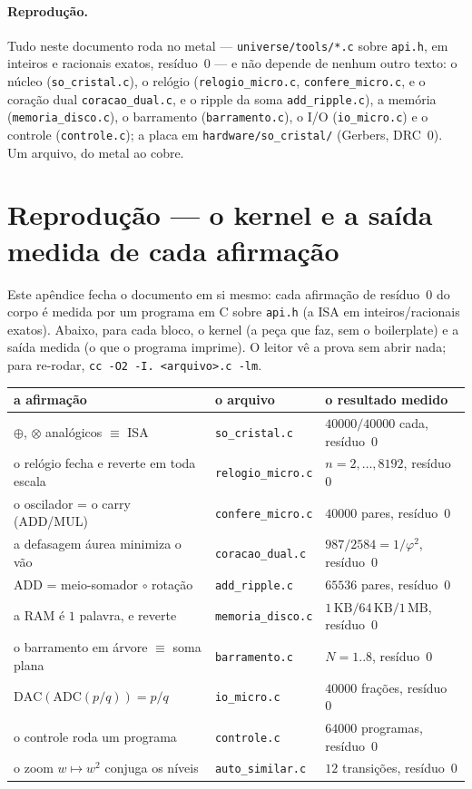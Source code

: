 \documentclass[11pt,a4paper]{article}
\begin{document}
\paragraph{Reprodução.}
Tudo neste documento roda no metal --- \texttt{universe/tools/*.c} sobre \texttt{api.h}, em
inteiros e racionais exatos, resíduo~$0$ --- e não depende de nenhum outro texto: o núcleo
(\texttt{so\_cristal.c}), o relógio (\texttt{relogio\_micro.c}, \texttt{confere\_micro.c}, e o coração dual
\texttt{coracao\_dual.c}, e o ripple da soma \texttt{add\_ripple.c}), a memória (\texttt{memoria\_disco.c}),
o barramento (\texttt{barramento.c}), o I/O (\texttt{io\_micro.c}) e o controle (\texttt{controle.c});
a placa em \texttt{hardware/so\_cristal/} (Gerbers, DRC~$0$). Um arquivo, do metal ao cobre.

\appendix

\section{Reprodução --- o kernel e a saída medida de cada afirmação}

Este apêndice fecha o documento em si mesmo: cada afirmação de resíduo~$0$ do corpo é medida
por um programa em C sobre \texttt{api.h} (a ISA em inteiros/racionais exatos). Abaixo, para cada
bloco, o kernel (a peça que faz, sem o boilerplate) e a saída medida (o que o programa imprime).
O leitor vê a prova sem abrir nada; para re-rodar, \texttt{cc -O2 -I. <arquivo>.c -lm}.

\begin{center}
\begin{tabular}{@{}lll@{}}
\toprule
a afirmação & o arquivo & o resultado medido \\
\midrule
$\oplus$, $\otimes$ analógicos $\equiv$ ISA & \texttt{so\_cristal.c} & $40000/40000$ cada, resíduo~$0$ \\
o relógio fecha e reverte em toda escala & \texttt{relogio\_micro.c} & $n=2,\ldots,8192$, resíduo~$0$ \\
o oscilador = o carry (ADD/MUL) & \texttt{confere\_micro.c} & $40000$ pares, resíduo~$0$ \\
a defasagem áurea minimiza o vão & \texttt{coracao\_dual.c} & $987/2584=1/\varphi^{2}$, resíduo~$0$ \\
ADD = meio-somador $\circ$ rotação & \texttt{add\_ripple.c} & $65536$ pares, resíduo~$0$ \\
a RAM é $1$ palavra, e reverte & \texttt{memoria\_disco.c} & $1\,\mathrm{KB}/64\,\mathrm{KB}/1\,\mathrm{MB}$, resíduo~$0$ \\
o barramento em árvore $\equiv$ soma plana & \texttt{barramento.c} & $N=1..8$, resíduo~$0$ \\
$\mathrm{DAC}(\mathrm{ADC}(p/q))=p/q$ & \texttt{io\_micro.c} & $40000$ frações, resíduo~$0$ \\
o controle roda um programa & \texttt{controle.c} & $64000$ programas, resíduo~$0$ \\
o zoom $w\mapsto w^{2}$ conjuga os níveis & \texttt{auto\_similar.c} & $12$ transições, resíduo~$0$ \\
\bottomrule
\end{tabular}
\end{center}
\end{document}
